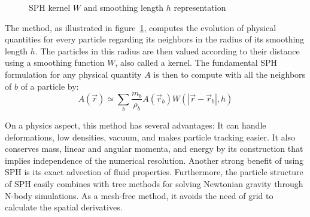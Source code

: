 \begin{figure}
\centering
{}
\caption{SPH kernel $W$ and smoothing length $h$ representation}
\label{fig:sph_base}
\end{figure}

The method, as illustrated in figure~\ref{fig:sph_base}, computes the evolution of physical quantities for every particle regarding its neighbors in the radius of its smoothing length $h$. 
The particles in this radius are then valued according to their distance using a smoothing function $W$, also called a kernel. 
The fundamental SPH formulation for any physical quantity $A$ is then to compute with all the neighbors of $b$ of a particle by:
\begin{equation}
A(\vec{r}) \simeq \sum_b \frac{m_b}{\rho_b} A(\vec{r}_b) W ( |\vec{r}-\vec{r}_b|,h)
\end{equation}

On a physics aspect, this method has several advantages:
It can handle deformations, low densities, vacuum, and makes particle tracking easier. 
It also conserves mass, linear and angular momenta, and energy by its construction that implies independence of the numerical resolution. 
Another strong benefit of using SPH is its exact advection of fluid properties. 
Furthermore, the particle structure of SPH easily combines with tree methods for solving Newtonian gravity through N-body simulations.
As a mesh-free method, it avoids the need of grid to calculate the spatial derivatives. 

